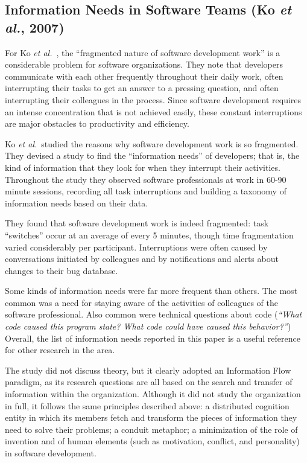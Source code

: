 \subsection{Information Needs in Software Teams (Ko \emph{et al.}, 2007)}

For Ko \emph{et al.}\ , the ``fragmented nature of software development work'' is a considerable problem for software organizations. They note that developers communicate with each other frequently throughout their daily work, often interrupting their tasks to get an answer to a pressing question, and often interrupting their colleagues in the process. Since software development requires an intense concentration that is not achieved easily, these constant interruptions are major obstacles to productivity and efficiency.

Ko \emph{et al.}\ studied the reasons why software development work is so fragmented. They devised a study to find the ``information needs'' of developers; that is, the kind of information that they look for when they interrupt their activities. Throughout the study they observed software professionals at work in 60-90 minute sessions, recording all task interruptions and building a taxonomy of information needs based on their data.

They found that software development work is indeed fragmented: task ``switches'' occur at an average of every 5 minutes, though time fragmentation varied considerably per participant. Interruptions were often caused by conversations initiated by colleagues and by notifications and alerts about changes to their bug database.

Some kinds of information needs were far more frequent than others. The most common was a need for staying aware of the activities of colleagues of the software professional. Also common were technical questions about code (\emph{``What code caused this program state? What code could have caused this behavior?''}) Overall, the list of information needs reported in this paper is a useful reference for other research in the area.

The study did not discuss theory, but it clearly adopted an Information Flow paradigm, as its research questions are all based on the search and transfer of information within the organization. Although it did not study the organization in full, it follows the same principles described above: a distributed cognition entity in which its members fetch and transform the pieces of information they need to solve their problems; a conduit metaphor; a minimization of the role of invention and of human elements (such as motivation, conflict, and personality) in software development.

